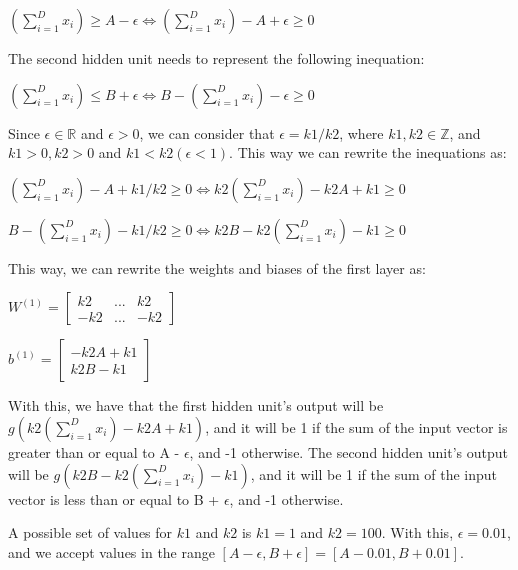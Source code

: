 \documentclass{article}
\begin{document}
\bigskip

$(\sum_{i=1}^{D} x_i) \geq A - \epsilon \iff (\sum_{i=1}^{D} x_i) - A + \epsilon \geq 0$

\bigskip

The second hidden unit needs to represent the following inequation:

\bigskip

$(\sum_{i=1}^{D} x_i) \leq B + \epsilon \iff B - (\sum_{i=1}^{D} x_i) - \epsilon \geq 0$

\bigskip

Since $\epsilon \in \mathbb{R}$ and $\epsilon > 0$, we can consider that $\epsilon = k1/k2$, where $k1, k2 \in \mathbb{Z}$, 
and $k1 > 0, k2 > 0$ and $k1 < k2 (\epsilon < 1)$. This way we can rewrite the inequations as:

\bigskip

$(\sum_{i=1}^{D} x_i) - A + k1/k2 \geq 0 \iff k2(\sum_{i=1}^{D} x_i) - k2A + k1 \geq 0$

\bigskip

$B - (\sum_{i=1}^{D} x_i) - k1/k2 \geq 0 \iff k2B - k2(\sum_{i=1}^{D} x_i) - k1 \geq 0$

\bigskip

This way, we can rewrite the weights and biases of the first layer as:

\bigskip

\( W^{(1)} = \begin{bmatrix}
    k2  & ... & k2  \\
    -k2 & ... & -k2
\end{bmatrix}
\)

\medskip

\(b^{(1)} = \begin{bmatrix}
    -k2A + k1 \\
    k2B - k1
\end{bmatrix}
\)

\bigskip

With this, we have that the first hidden unit's output will be $g(k2(\sum_{i=1}^{D} x_i) - k2A + k1)$, and it will be 1 if the sum of the 
input vector is greater than or equal to A - $\epsilon$, and -1 otherwise. The second hidden unit's output will be $g(k2B - k2(\sum_{i=1}^{D} x_i) - k1)$,
and it will be 1 if the sum of the input vector is less than or equal to B + $\epsilon$, and -1 otherwise.

A possible set of values for $k1$ and $k2$ is $k1 = 1$ and $k2 = 100$. With this, $\epsilon = 0.01$, and we accept values in
the range $[A - \epsilon, B + \epsilon] = [A - 0.01, B + 0.01]$.
\end{document}
